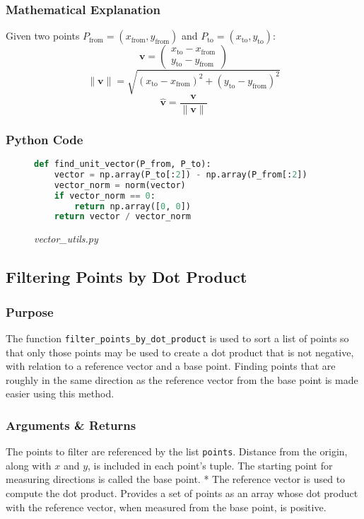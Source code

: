 \documentclass[12pt,a4paper]{report}
\begin{document}
\subsubsection{Mathematical Explanation}
Given two points \( P_{\text{from}} = (x_{\text{from}}, y_{\text{from}}) \) and \( P_{\text{to}} = (x_{\text{to}}, y_{\text{to}}) \):
\[
\mathbf{v} = \begin{pmatrix}
x_{\text{to}} - x_{\text{from}} \\
y_{\text{to}} - y_{\text{from}}
\end{pmatrix}
\]
\[
\|\mathbf{v}\| = \sqrt{(x_{\text{to}} - x_{\text{from}})^2 + (y_{\text{to}} - y_{\text{from}})^2}
\]
\[
\hat{\mathbf{v}} = \frac{\mathbf{v}}{\|\mathbf{v}\|}
\]

\vspace*{\fill}\newpage

\subsubsection{Python Code}
\begin{figure}[ht!]
\centering
\caption*{\large\textit{vector\_utils.py}}
\begin{lstlisting}[language=Python, caption={Finding the Unit Vector Between Two Points}]
def find_unit_vector(P_from, P_to):
    vector = np.array(P_to[:2]) - np.array(P_from[:2])
    vector_norm = norm(vector)
    if vector_norm == 0:
        return np.array([0, 0])
    return vector / vector_norm
\end{lstlisting}
\end{figure}

\subsection{Filtering Points by Dot Product}

\subsubsection{Purpose}
The function \texttt{filter\_points\_by\_dot\_product} is used to sort a list of points so that only those points may be used to create a dot product that is not negative, with relation to a reference vector and a base point. Finding points that are roughly in the same direction as the reference vector from the base point is made easier using this method.

\subsubsection{Arguments \& Returns}
The points to filter are referenced by the list \texttt{points}. Distance from the origin, along with $x$ and $y$, is included in each point's tuple. The starting point for measuring directions is called the base point. * The reference vector is used to compute the dot product. Provides a set of points as an array whose dot product with the reference vector, when measured from the base point, is positive.
\end{document}
